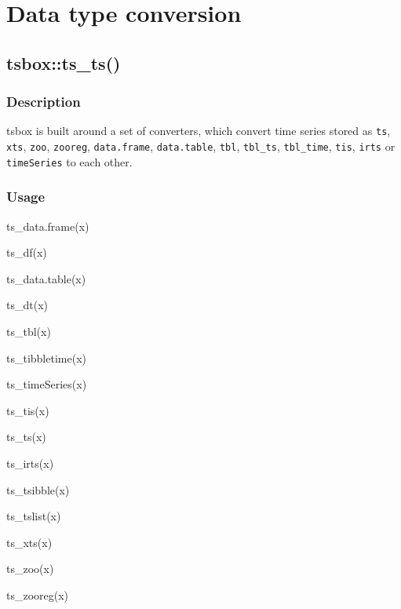\documentclass[
  letterpaper,
  DIV=11,
  numbers=noendperiod]{scrreport}
\newenvironment{Shaded}{\begin{snugshade}}{\end{snugshade}}
\newcommand{\FunctionTok}[1]{\textcolor[rgb]{0.28,0.35,0.67}{#1}}
\newcommand{\NormalTok}[1]{\textcolor[rgb]{0.00,0.23,0.31}{#1}}
\begin{document}
\section{Data type conversion}\label{sec-type}

\subsection{tsbox::ts\_ts()}\label{tsboxts_ts}

\subsubsection{Description}\label{description-50}

tsbox is built around a set of converters, which convert time series
stored as \texttt{ts}, \texttt{xts}, \texttt{zoo}, \texttt{zooreg},
\texttt{data.frame}, \texttt{data.table}, \texttt{tbl},
\texttt{tbl\_ts}, \texttt{tbl\_time}, \texttt{tis}, \texttt{irts} or
\texttt{timeSeries} to each other.

\subsubsection{Usage}\label{usage-50}

\begin{Shaded}
\begin{Highlighting}[]
\FunctionTok{ts\_data.frame}\NormalTok{(x)}

\FunctionTok{ts\_df}\NormalTok{(x)}

\FunctionTok{ts\_data.table}\NormalTok{(x)}

\FunctionTok{ts\_dt}\NormalTok{(x)}

\FunctionTok{ts\_tbl}\NormalTok{(x)}

\FunctionTok{ts\_tibbletime}\NormalTok{(x)}

\FunctionTok{ts\_timeSeries}\NormalTok{(x)}

\FunctionTok{ts\_tis}\NormalTok{(x)}

\FunctionTok{ts\_ts}\NormalTok{(x)}

\FunctionTok{ts\_irts}\NormalTok{(x)}

\FunctionTok{ts\_tsibble}\NormalTok{(x)}

\FunctionTok{ts\_tslist}\NormalTok{(x)}

\FunctionTok{ts\_xts}\NormalTok{(x)}

\FunctionTok{ts\_zoo}\NormalTok{(x)}

\FunctionTok{ts\_zooreg}\NormalTok{(x)}
\end{Highlighting}
\end{Shaded}
\end{document}
